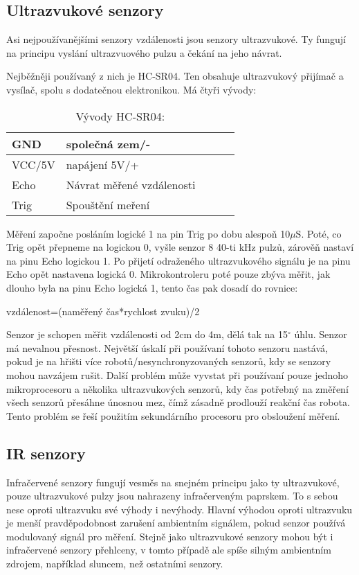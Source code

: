 \subsection{Ultrazvukové senzory}

Asi nejpoužívanějšími senzory vzdálenosti jsou senzory ultrazvukové.
Ty fungují na principu vyslání ultrazvuového pulzu a čekání na jeho návrat.

Nejběžněji používaný z nich je HC-SR04. 
Ten obsahuje ultrazvukový přijímač a vysílač, spolu s dodatečnou elektronikou.
Má čtyři vývody: 
\begin{table}[]
	\caption{Vývody HC-SR04:}
	\centering
	\begin{tabular}{|l|l|l|l|l|} \hline
		GND & společná zem/-   \\ \hline
		VCC/5V & napájení 5V/+  \\ \hline
		Echo & Návrat měřené vzdálenosti   \\ \hline
		Trig & Spouštění meření \\ \hline
	\end{tabular}
\end{table}

Měření započne posláním logické 1 na pin Trig po dobu alespoň 10$\mu$S.
Poté, co Trig opět přepneme na logickou 0, vyšle senzor 8 40-ti kHz pulzů, zárověň nastaví na pinu Echo logickou 1.
Po přijetí odraženého ultrazvukového signálu je na pinu Echo opět nastavena logická 0.
Mikrokontroleru poté pouze zbýva měřit, jak dlouho byla na pinu Echo logická 1, tento čas pak dosadí do rovnice:
\begin{center}
    vzdálenost=(naměřený čas*rychlost zvuku)/2
\end{center} 
Senzor je schopen měřit vzdálenosti od 2cm do 4m, dělá tak na 15$^{\circ}$ úhlu.
Senzor má nevalnou přesnost.
Největší úskalí při používaní tohoto senzoru nastává, pokud je na hřišti více robotů/nesynchronyzovaných senzorů, kdy se senzory mohou navzájem rušit.
Další problém může vyvstat při používaní pouze jednoho mikroprocesoru a několika ultrazvukových senzorů, kdy čas potřebný na změření všech senzorů přesáhne únosnou mez, čímž zásadně prodlouží reakční čas robota.
Tento problém se řeší použitím sekundárního procesoru pro obsloužení měření.
\cite{hc-sr04}

\subsection{IR senzory}
Infračervené senzory fungují vesměs na snejném principu jako ty ultrazvukové, pouze ultrazvukové pulzy jsou nahrazeny infračerveným paprskem.
To s sebou nese oproti ultrazvuku své výhody i nevýhody.
Hlavní výhodou oproti ultrazvuku je menší pravděpodobnost zarušení ambientním signálem, pokud senzor používá modulovaný signál pro měření.
Stejně jako ultrazvukové senzory mohou být i infračervené senzory přehlceny, v tomto případě ale spíše silným ambientním zdrojem, například sluncem, než ostatními senzory.

